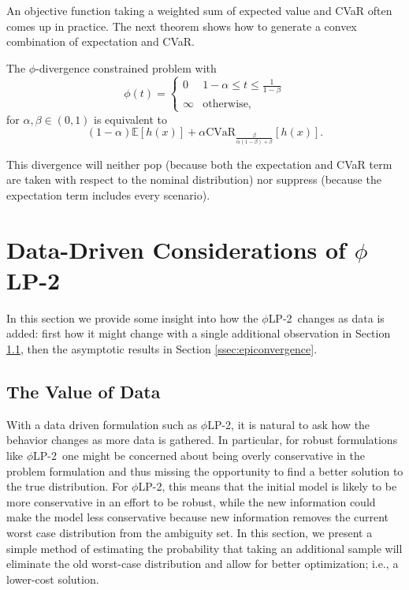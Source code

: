 \documentclass[ijoc,letterpaper]{informs3} %
\newcommand{\E}{\mathbb{E}}
\newcommand{\e}[1]{\E \left[ #1 \right]}
\newcommand{\plp}{$\phi$LP-2}
\begin{document}
An objective function taking a weighted sum of expected value and CVaR often comes up in practice.
The next theorem shows how to generate a convex combination of expectation and CVaR.

\begin{example}
	The $\phi$-divergence constrained problem with
	\[
		\phi(t) = 
		\begin{cases}
			0 & 1-\alpha \leq t \leq \frac{1}{1-\beta} \\
			\infty & \text{otherwise},
		\end{cases}
	\]
	for $\alpha,\beta \in (0,1)$ is equivalent to 
	\[
		(1-\alpha)\e{h(x)} + \alpha \mbox{CVaR}_{\frac{\beta}{\alpha(1-\beta)+\beta}}[h(x)].
	\]
\end{example}

\begin{remark}
	This divergence will neither pop (because both the expectation and CVaR term are taken with respect to the nominal distribution) nor suppress (because the expectation term includes every scenario).
\end{remark}

\section{Data-Driven Considerations of \plp}
\label{sec:properties}

In this section we provide some insight into how the \plp\ changes as data is added: first how it might change with a single additional observation in Section \ref{ssec:value}, then the asymptotic results in Section \ref{ssec:epiconvergence}.

\subsection{The Value of Data} \label{ssec:value}

With a data driven formulation such as \plp, it is natural to ask how the behavior changes as more data is gathered.
In particular, for robust formulations like \plp\ one might be concerned about being overly conservative in the problem formulation and thus missing the opportunity to find a better solution to the true distribution.
For \plp, this means that the initial model is likely to be more conservative in an effort to be robust, while the new information could make the model less conservative because new information removes the current worst case distribution from the ambiguity set.  
In this section, we present a simple method of estimating the probability that taking an additional sample will eliminate the old worst-case distribution and allow for better optimization; i.e., a lower-cost solution.
\end{document}
